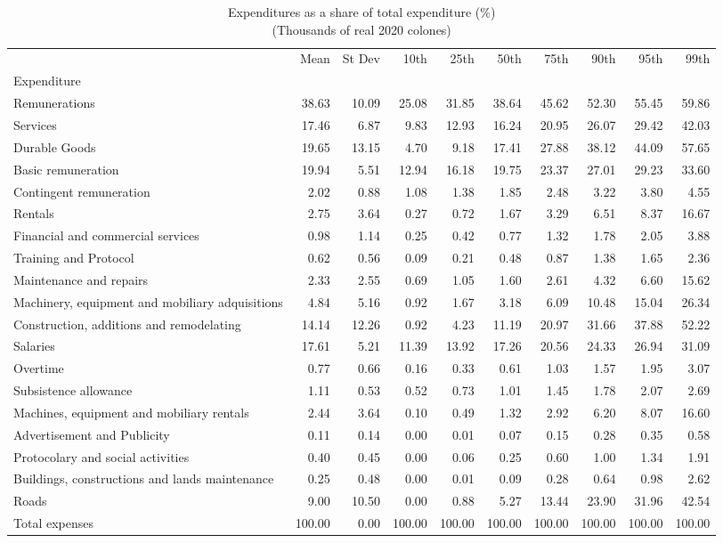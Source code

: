 \begin{table}[h]
\centering
\caption{Expenditures as a share of total expenditure (\%)\\(Thousands of real 2020 colones)}
\begin{tabular}{lrrrrrrrrr}
\toprule
 & Mean & St Dev & 10th & 25th & 50th & 75th & 90th & 95th & 99th \\
Expenditure &  &  &  &  &  &  &  &  &  \\
\midrule
Remunerations & 38.63 & 10.09 & 25.08 & 31.85 & 38.64 & 45.62 & 52.30 & 55.45 & 59.86 \\
Services & 17.46 & 6.87 & 9.83 & 12.93 & 16.24 & 20.95 & 26.07 & 29.42 & 42.03 \\
Durable Goods & 19.65 & 13.15 & 4.70 & 9.18 & 17.41 & 27.88 & 38.12 & 44.09 & 57.65 \\
Basic remuneration & 19.94 & 5.51 & 12.94 & 16.18 & 19.75 & 23.37 & 27.01 & 29.23 & 33.60 \\
Contingent remuneration & 2.02 & 0.88 & 1.08 & 1.38 & 1.85 & 2.48 & 3.22 & 3.80 & 4.55 \\
Rentals & 2.75 & 3.64 & 0.27 & 0.72 & 1.67 & 3.29 & 6.51 & 8.37 & 16.67 \\
Financial and commercial services & 0.98 & 1.14 & 0.25 & 0.42 & 0.77 & 1.32 & 1.78 & 2.05 & 3.88 \\
Training and Protocol & 0.62 & 0.56 & 0.09 & 0.21 & 0.48 & 0.87 & 1.38 & 1.65 & 2.36 \\
Maintenance and repairs & 2.33 & 2.55 & 0.69 & 1.05 & 1.60 & 2.61 & 4.32 & 6.60 & 15.62 \\
Machinery, equipment and mobiliary adquisitions & 4.84 & 5.16 & 0.92 & 1.67 & 3.18 & 6.09 & 10.48 & 15.04 & 26.34 \\
Construction, additions and remodelating & 14.14 & 12.26 & 0.92 & 4.23 & 11.19 & 20.97 & 31.66 & 37.88 & 52.22 \\
Salaries & 17.61 & 5.21 & 11.39 & 13.92 & 17.26 & 20.56 & 24.33 & 26.94 & 31.09 \\
Overtime & 0.77 & 0.66 & 0.16 & 0.33 & 0.61 & 1.03 & 1.57 & 1.95 & 3.07 \\
Subsistence allowance & 1.11 & 0.53 & 0.52 & 0.73 & 1.01 & 1.45 & 1.78 & 2.07 & 2.69 \\
Machines, equipment and mobiliary rentals & 2.44 & 3.64 & 0.10 & 0.49 & 1.32 & 2.92 & 6.20 & 8.07 & 16.60 \\
Advertisement and Publicity & 0.11 & 0.14 & 0.00 & 0.01 & 0.07 & 0.15 & 0.28 & 0.35 & 0.58 \\
Protocolary and social activities & 0.40 & 0.45 & 0.00 & 0.06 & 0.25 & 0.60 & 1.00 & 1.34 & 1.91 \\
Buildings, constructions and lands maintenance & 0.25 & 0.48 & 0.00 & 0.01 & 0.09 & 0.28 & 0.64 & 0.98 & 2.62 \\
Roads & 9.00 & 10.50 & 0.00 & 0.88 & 5.27 & 13.44 & 23.90 & 31.96 & 42.54 \\
Total expenses & 100.00 & 0.00 & 100.00 & 100.00 & 100.00 & 100.00 & 100.00 & 100.00 & 100.00 \\
\bottomrule
\end{tabular}
\end{table}
